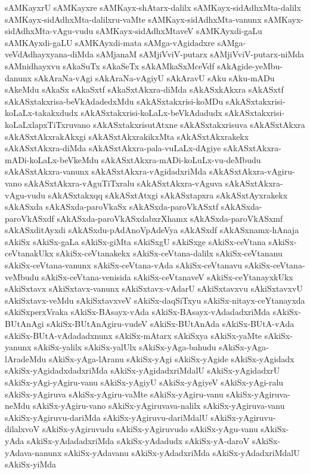 {sAMKayxrU
sAMKayxre
sAMKayx-shAtarx-dalilx
sAMKayx-sidAdhxMta-dalilx
sAMKayx-sidAdhxMta-dalilxru-vaMte
sAMKayx-sidAdhxMta-vanunx
sAMKayx-sidAdhxMta-vAgu-vudu
sAMKayx-sidAdhxMtaveV
sAMKAyxdi-gaLu
sAMKAyxdi-gaLU
sAMKAyxdi-mata
sAMga-vAgidadxre
sAMga-veVdAdhayxyana-diMda
sAMjanaM
sAMjiVviV-putarx
sAMjiVviV-putarx-niMda
sAMnidhayxvu
sAkaSuTx
sAkaSeTx
sAkAMkaSxMceVdf
sAkAgide-yeMbu-danunx
sAkAraNa-vAgi
sAkAraNa-vAgiyU
sAkAravU
sAku
sAku-mADu
sAkeMdu
sAkaSx
sAkaSxtf
sAkaSxtAkxra-diMda
sAkASxkAkxra
sAkASxtf
sAkASxtakxrisa-beVkAdadedxMdu
sAkASxtakxrisi-koMDu
sAkASxtakxrisi-koLaLx-takakxdudx
sAkASxtakxrisi-koLaLx-beVkAdadudx
sAkASxtakxrisi-koLaLxlapxTiTxruvano
sAkASxtakxrisutAtxne
sAkASxtakxrisuva
sAkASxtAkxra
sAkASxtAkxrakAkxgi
sAkASxtAkxrakikxMta
sAkASxtAkxrakekx
sAkASxtAkxra-diMda
sAkASxtAkxra-pala-vuLaLx-dAgiye
sAkASxtAkxra-mADi-koLaLx-beVkeMdu
sAkASxtAkxra-mADi-koLuLx-vu-deMbudu
sAkASxtAkxra-vanunx
sAkASxtAkxra-vAgidadxriMda
sAkASxtAkxra-vAgiru-vano
sAkASxtAkxra-vAguTiTxralu
sAkASxtAkxra-vAguva
sAkASxtAkxra-vAgu-vudu
sAkASxtakxqq
sAkASxtAtxgi
sAkASxtapxra
sAkASxtAyxrakekx
sAkASxda
sAkASxda-paroVkaSx
sAkASxda-paroVkASxtf
sAkASxda-paroVkASxdf
sAkASxda-paroVkASxdabxrXhamx
sAkASxda-paroVkASxmf
sAkASxditAyxdi
sAkASxdu-pAdAnoVpAdeVya
sAkASxdf
sAkASxnamx-hAnaja
sAkiSx
sAkiSx-gaLa
sAkiSx-giMta
sAkiSxgU
sAkiSxge
sAkiSx-ceVtana
sAkiSx-ceVtanakUkx
sAkiSx-ceVtanakekx
sAkiSx-ceVtana-dalilx
sAkiSx-ceVtananu
sAkiSx-ceVtana-vanunx
sAkiSx-ceVtana-vAda
sAkiSx-ceVtanavu
sAkiSx-ceVtana-veMbudu
sAkiSx-ceVtana-venisida
sAkiSx-ceVtanaveV
sAkiSx-ceYtanayxkUkx
sAkiSxtavx
sAkiSxtavx-vanunx
sAkiSxtavx-vAdarU
sAkiSxtavxvu
sAkiSxtavxvU
sAkiSxtavx-veMdu
sAkiSxtavxveV
sAkiSx-daqSiTxyu
sAkiSx-nitayx-ceYtanayxda
sAkiSxperxVraka
sAkiSx-BAsayx-vAda
sAkiSx-BAsayx-vAdadadxriMda
sAkiSx-BUtAnAgi
sAkiSx-BUtAnAgiru-vudeV
sAkiSx-BUtAnAda
sAkiSx-BUtA-vAda
sAkiSx-BUtA-vAdadadxnunx
sAkiSx-mAtarx
sAkiSxya
sAkiSx-yaMte
sAkiSx-yanunx
sAkiSx-yalilx
sAkiSx-yalUlx
sAkiSx-yAga-bahudu
sAkiSx-yAga-lAradeMdu
sAkiSx-yAga-lAranu
sAkiSx-yAgi
sAkiSx-yAgide
sAkiSx-yAgidadx
sAkiSx-yAgidadxdadxriMda
sAkiSx-yAgidadxriMdalU
sAkiSx-yAgidadxrU
sAkiSx-yAgi-yAgiru-vanu
sAkiSx-yAgiyU
sAkiSx-yAgiyeV
sAkiSx-yAgi-ralu
sAkiSx-yAgiruva
sAkiSx-yAgiru-vaMte
sAkiSx-yAgiru-vanu
sAkiSx-yAgiruva-neMdu
sAkiSx-yAgiru-vano
sAkiSx-yAgiruvava-nalilx
sAkiSx-yAgiruva-vanu
sAkiSx-yAgiruvu-dariMda
sAkiSx-yAgiruvu-dariMdalU
sAkiSx-yAgiruvu-dilalxvoV
sAkiSx-yAgiruvudu
sAkiSx-yAgiruvudo
sAkiSx-yAgu-vanu
sAkiSx-yAda
sAkiSx-yAdadadxriMda
sAkiSx-yAdadudx
sAkiSx-yA-daroV
sAkiSx-yAdava-nanunx
sAkiSx-yAdavanu
sAkiSx-yAdadxriMda
sAkiSx-yAdadxriMdalU
sAkiSx-yiMda
}
